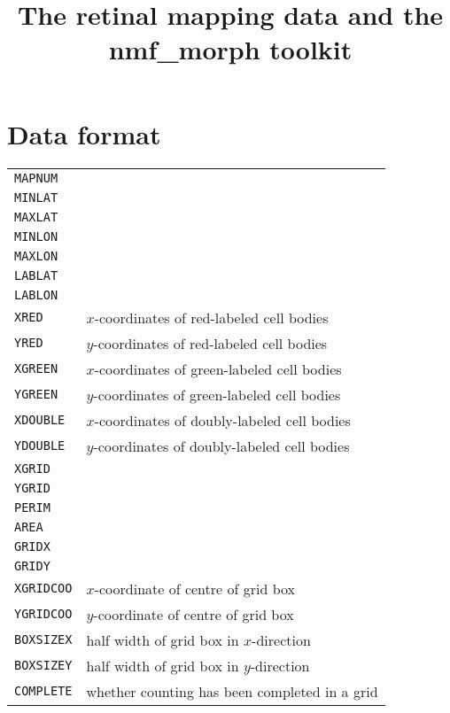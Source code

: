 \documentclass{article}
\title{The retinal mapping data and the nmf\_morph toolkit}
\begin{document}
\maketitle

\section{Data format}
\label{manual:sec:reading-data}

\begin{table}
  \begin{tabular}{ll}
    \texttt{MAPNUM}   & \\  
    \texttt{MINLAT}   & \\
    \texttt{MAXLAT}   & \\
    \texttt{MINLON}   & \\
    \texttt{MAXLON}   & \\
    \texttt{LABLAT}   & \\
    \texttt{LABLON}   & \\
    \texttt{XRED}     & $x$-coordinates of red-labeled cell bodies    \\
    \texttt{YRED}     & $y$-coordinates of red-labeled cell bodies    \\
    \texttt{XGREEN}   & $x$-coordinates of green-labeled cell bodies  \\
    \texttt{YGREEN}   & $y$-coordinates of green-labeled cell bodies  \\
    \texttt{XDOUBLE}  & $x$-coordinates of doubly-labeled cell bodies \\ 
    \texttt{YDOUBLE}  & $y$-coordinates of doubly-labeled cell bodies \\
    \texttt{XGRID}    & \\
    \texttt{YGRID}    & \\
    \texttt{PERIM}    & \\
    \texttt{AREA}     & \\
    \texttt{GRIDX}    & \\
    \texttt{GRIDY}    & \\
    \texttt{XGRIDCOO} & $x$-coordinate of centre of grid box \\
    \texttt{YGRIDCOO} & $y$-coordinate of centre of grid box \\
    \texttt{BOXSIZEX} & half width of grid box in $x$-direction \\
    \texttt{BOXSIZEY} & half width of grid box in $y$-direction \\
    \texttt{COMPLETE} & whether counting has been completed in a grid

\end{tabular}
\end{table}
\end{document}
